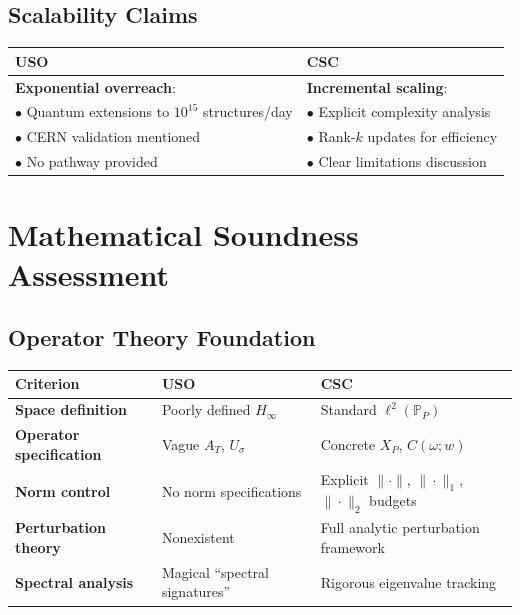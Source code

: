 \documentclass[10pt]{article}
\begin{document}
\subsection*{Scalability Claims}

\begin{table}[h!]
\centering
\begin{tabular}{L{6cm}L{6cm}}
\toprule
\textcolor{usored}{\textbf{USO}} & \textcolor{cscgreen}{\textbf{CSC}} \\
\midrule
\textbf{Exponential overreach}: & \textbf{Incremental scaling}: \\
\quad $\bullet$ Quantum extensions to $10^{15}$ structures/day & \quad $\bullet$ Explicit complexity analysis \\
\quad $\bullet$ CERN validation mentioned & \quad $\bullet$ Rank-$k$ updates for efficiency \\
\quad $\bullet$ No pathway provided & \quad $\bullet$ Clear limitations discussion \\
\bottomrule
\end{tabular}
\end{table}

\section*{Mathematical Soundness Assessment}

\subsection*{Operator Theory Foundation}

\begin{table}[h!]
\centering
\begin{tabular}{L{3cm}C{4cm}C{4cm}}
\toprule
\textbf{Criterion} & \textcolor{usored}{\textbf{USO}} & \textcolor{cscgreen}{\textbf{CSC}} \\
\midrule
\textbf{Space definition} & Poorly defined $H_\infty$ & Standard $\ell^2(\mathbb{P}_P)$ \\
\textbf{Operator specification} & Vague $A_T$, $U_\sigma$ & Concrete $X_P$, $C(\omega; w)$ \\
\textbf{Norm control} & No norm specifications & Explicit $\|\cdot\|$, $\|\cdot\|_1$, $\|\cdot\|_2$ budgets \\
\textbf{Perturbation theory} & Nonexistent & Full analytic perturbation framework \\
\textbf{Spectral analysis} & Magical ``spectral signatures'' & Rigorous eigenvalue tracking \\
\bottomrule
\end{tabular}
\end{table}
\end{document}
